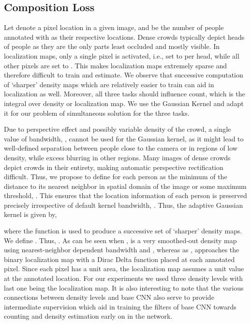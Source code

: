 \documentclass[runningheads]{llncs}
\begin{document}
\subsection{Composition Loss}
Let  denote a pixel location in a given image, and  be the number of people annotated with  as their respective locations. Dense crowds typically depict heads of people as they are the only parts least occluded and mostly visible. In localization maps, only a single pixel is activated, i.e., set to  per head, while all other pixels are set to . This makes localization maps extremely sparse and therefore difficult to train and estimate. We observe that successive computation of `sharper' density maps which are relatively easier to train can aid in localization as well. Moreover, all three tasks should influence count, which is the integral over density or localization map. We use the Gaussian Kernel and adapt it for our problem of simultaneous solution for the three tasks.

Due to perspective effect and possibly variable density of the crowd, a single value of bandwidth, , cannot be used for the Gaussian kernel, as it might lead to well-defined separation between people close to the camera or in regions of low density, while excess blurring in other regions. Many images of dense crowds depict crowds in their entirety, making automatic perspective rectification difficult. Thus, we propose to define  for each person  as the minimum of the  distance to its nearest neighbor in spatial domain of the image or some maximum threshold, . This ensures that the location information of each person is preserved precisely irrespective of default kernel bandwidth, . Thus, the adaptive Gaussian kernel is given by,

where the function  is used to produce a successive set of `sharper' density maps. We define . Thus, . As can be seen when ,  is a very smoothed-out density map using nearest-neighbor dependent bandwidth and , whereas as ,  approaches the binary localization map with a Dirac Delta function placed at each annotated pixel. Since each pixel has a unit area, the localization map assumes a unit value at the annotated location. For our experiments we used three density levels with last one being the localization map. It is also interesting to note that the various connections between density levels and base CNN also serve to provide intermediate supervision which aid in training the filters of base CNN towards counting and density estimation early on in the network.
\end{document}
